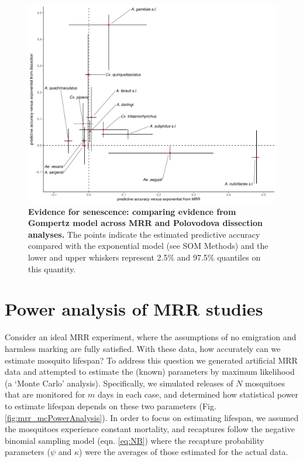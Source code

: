 \documentclass[12pt]{article}
\begin{document}
\begin{figure}[ht]
	\centerline{\includegraphics[width=1\textwidth]{./Figure_files/elpd_comparison.pdf}}
	\caption{\textbf{Evidence for senescence: comparing evidence from Gompertz model across MRR and Polovodova dissection analyses.} The points indicate the estimated predictive accuracy compared with the exponential model (see SOM Methods) and the lower and upper whiskers represent 2.5\% and 97.5\% quantiles on this quantity.}\label{fig:elpd_comparison}
\end{figure}


\section{Power analysis of MRR studies}
Consider an ideal MRR experiment, where the assumptions of no emigration and harmless marking are fully satisfied. With these data, how accurately can we estimate mosquito lifespan? To address this question we generated artificial MRR data and attempted to estimate the (known) parameters by maximum likelihood (a `Monte Carlo' analysis). Specifically, we simulated releases of $N$ mosquitoes that are monitored for $m$ days in each case, and determined how statistical power to estimate lifespan depends on these two parameters (Fig. \ref{fig:mrr_mcPowerAnalysis}). In order to focus on estimating lifespan, we assumed the mosquitoes experience constant mortality, and recaptures follow the negative binomial sampling model (eqn. \ref{eq:NB}) where the recapture probability parameters ($\psi$ and $\kappa$) were the averages of those estimated for the actual data.
\end{document}
